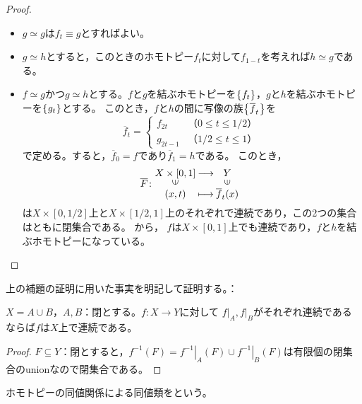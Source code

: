 \documentclass[uplatex]{jsarticle}
\renewcommand{\restriction}[2]{\left. #1 \right|_{#2}}
\begin{document}
\begin{proof}
  \begin{itemize}
    \vspace{-0.5\baselineskip}
    \item $g \simeq g$は$f_{t} \equiv g$とすればよい。
    \item $g \simeq h$とすると，このときのホモトピー$f_{t}$に対して$f_{1-t}$を考えれば$h \simeq g$である。
    \item $f \simeq g$かつ$g \simeq h$とする。$f$と$g$を結ぶホモトピーを$\Set{\hspace{-1.8pt} f_{t} \hspace{-1.8pt}}$，$g$と$h$を結ぶホモトピーを$\Set{\hspace{-1.8pt} g_{t} \hspace{-1.8pt}}$とする。
    このとき，$f$と$h$の間に写像の族$\Set{\hspace{-1.8pt} \overline{f}_{t} \hspace{-1.8pt}}$を
    \begin{equation}
      \overline{f}_{t} = \begin{cases}
        f_{2t} & （0 \le t \le 1/2） \\
        g_{2t-1} & （1/2 \le t \le 1）
      \end{cases}
    \end{equation}
    で定める。すると，$\overline{f}_{0} = f$であり$\overline{f}_{1} = h$である。
    このとき，
    \begin{equation}
      \overline{F} \colon \mapdef{X \times [0,1]}{Y}{(x,t)}{\overline{f}_{t}(x)}
    \end{equation}
    は$X \times [0,1/2]$上と$X \times [1/2,1]$上のそれぞれで連続であり，この2つの集合はともに閉集合である。
    から， $f$は$X \times [0,1]$上でも連続であり，$f$と$h$を結ぶホモトピーになっている。
  \end{itemize}
\end{proof}

上の補題の証明に用いた事実を明記して証明する。：

\begin{hodai}
  \label{close.continuous}
  $X = A \cup B$，$A,B$：閉とする。$f \colon X \longrightarrow Y$に対して
  $\restriction{f}{A},\restriction{f}{B}$がそれぞれ連続であるならば$f$は$X$上で連続である。
\end{hodai}

\begin{proof}
  $F \subseteq Y$：閉とすると，$f^{-1} (F) = \restriction{f^{-1}}{A}(F) \cup \restriction{f^{-1}}{B}(F)$は有限個の閉集合のunionなので閉集合である。
\end{proof}

\begin{teigi}[ホモトピー類]
  ホモトピーの同値関係による同値類をという。
\end{teigi}
\end{document}
